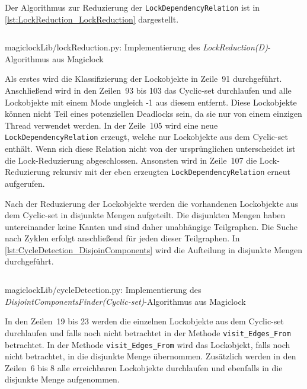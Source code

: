 Der Algorithmus zur Reduzierung der \texttt{Lock\-Dependency\-Relation} ist in
\cref{lst:LockReduction_LockReduction} dargestellt.
\begin{listing}[ht]
  \inputminted[frame=lines,linenos,firstline=90]{python}{./Python/magiclockLib/lockReduction.py}
  \caption{magiclockLib/lockReduction.py: Implementierung des \emph{LockReduction(D)}-Algorithmus aus Magiclock \autocite[5]{MagicLock}}
  \label{lst:LockReduction_LockReduction}
\end{listing}
Als erstes wird die Klassifizierung der Lockobjekte in Zeile~91 durchgeführt.
Anschließend wird in den Zeilen~93 bis 103 das \textrm{Cyclic-set} durchlaufen
und alle Lockobjekte mit einem Mode ungleich -1 aus diesem entfernt. Diese
Lockobjekte können nicht Teil eines potenziellen Deadlocks sein, da sie nur von
einem einzigen Thread verwendet werden. In der Zeile~105 wird eine neue
\texttt{Lock\-Dependency\-Relation} erzeugt, welche nur Lockobjekte aus dem
\textrm{Cyclic-set} enthält. Wenn sich diese Relation nicht von der
ursprünglichen unterscheidet ist die Lock-Reduzierung abgeschlossen. Ansonsten
wird in Zeile~107 die Lock-Reduzierung rekursiv mit der eben erzeugten
\texttt{Lock\-Dependency\-Relation} erneut aufgerufen.

Nach der Reduzierung der Lockobjekte werden die vorhandenen Lockobjekte aus dem
\textrm{Cyclic-set} in disjunkte Mengen aufgeteilt. Die disjunkten Mengen haben
untereinander keine Kanten und sind daher unabhängige Teilgraphen. Die Suche
nach Zyklen erfolgt anschließend für jeden dieser Teilgraphen. In
\cref{lst:CycleDetection_DisjoinComponents} wird die Aufteilung in disjunkte
Mengen durchgeführt. 
\begin{listing}[ht]
  \inputminted[frame=lines,linenos,firstline=1,lastline=25]{python}{./Python/magiclockLib/cycleDetection.py}
  \caption{magiclockLib/cycleDetection.py: Implementierung des \emph{Dis\-joint\-Com\-ponents\-Finder\-(Cyclic-set)}-Algorithmus aus Magiclock \autocite[8]{MagicLock}}
  \label{lst:CycleDetection_DisjoinComponents}
\end{listing}
In den Zeilen~19 bis 23 werden die einzelnen Lockobjekte aus dem
\textrm{Cyclic-set} durchlaufen und falls noch nicht betrachtet in der Methode
\texttt{visit\_Edges\_From} betrachtet. In der Methode \texttt{visit\_Edges\_From}
wird das Lockobjekt, falls noch nicht betrachtet, in die disjunkte Menge
übernommen. Zusätzlich werden in den Zeilen~6 bis 8 alle erreichbaren
Lockobjekte durchlaufen und ebenfalls in die disjunkte Menge aufgenommen.


